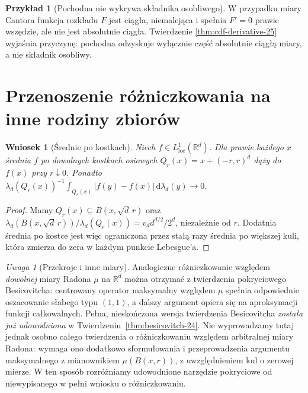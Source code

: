 \documentclass[11pt,a4paper,oneside]{book}
\numberwithin{equation}{chapter}
\theoremstyle{plain}
\newtheorem{wniosek}[twierdzenie]{Wniosek}
\theoremstyle{definition}
\newtheorem{przyklad}[twierdzenie]{Przykład}
\theoremstyle{remark}
\newtheorem{uwaga}[twierdzenie]{Uwaga}
\begin{document}
\begin{przyklad}[Pochodna nie wykrywa składnika osobliwego]
W przypadku miary Cantora funkcja rozkładu $F$ jest
ciągła, niemalejąca i spełnia $F'=0$ prawie wszędzie,
ale nie jest absolutnie ciągła. Twierdzenie
\ref{thm:cdf-derivative-25} wyjaśnia przyczynę:
pochodna odzyskuje wyłącznie część absolutnie ciągłą
miary, a nie składnik osobliwy.
\end{przyklad}

\section{Przenoszenie różniczkowania na inne rodziny zbiorów}
\begin{wniosek}[Średnie po kostkach]
\label{cor:cubes-differentiation-25}
Niech $f\in L^1_{\mathrm{loc}}(\mathbb R^d)$. Dla prawie
każdego $x$ średnia $f$ po dowolnych kostkach osiowych
$Q_r(x)=x+(-r,r)^d$ dąży do $f(x)$ przy $r\downarrow0$.
Ponadto $\lambda_d(Q_r(x))^{-1}
\int_{Q_r(x)}|f(y)-f(x)|\,\mathrm d\lambda_d(y)\to0$.
\end{wniosek}
\begin{proof}
Mamy $Q_r(x)\subseteq B(x,\sqrt d\,r)$ oraz
$\lambda_d(B(x,\sqrt d\,r))/\lambda_d(Q_r(x))
=v_dd^{d/2}/2^d$, niezależnie od $r$. Dodatnia średnia
po kostce jest więc ograniczona przez stałą razy
średnia po większej kuli, która zmierza do zera
w każdym punkcie Lebesgue'a.
\end{proof}

\begin{uwaga}[Przekroje i inne miary]
Analogiczne różniczkowanie względem \emph{dowolnej}
miary Radona $\mu$ na $\mathbb R^d$ można otrzymać
z twierdzenia pokryciowego Besicovitcha:
centrowany operator maksymalny względem $\mu$ spełnia
odpowiednie oszacowanie słabego typu $(1,1)$, a dalszy
argument opiera się na aproksymacji funkcji całkowalnych.
Pełna, nieskończona wersja twierdzenia Besicovitcha
\emph{została już udowodniona} w
Twierdzeniu~\ref{thm:besicovitch-24}.
Nie wyprowadzamy tutaj jednak osobno całego twierdzenia
o różniczkowaniu względem arbitralnej miary Radona:
wymaga ono dodatkowo sformułowania i przeprowadzenia
argumentu maksymalnego z mianownikiem $\mu(B(x,r))$,
z uwzględnieniem kul o zerowej mierze.
W ten sposób rozróżniamy udowodnione narzędzie pokryciowe
od niewypisanego w pełni wniosku o różniczkowaniu.
\end{uwaga}



\end{document}
